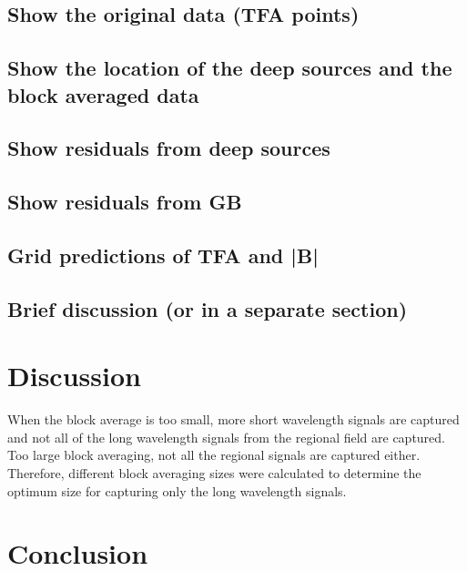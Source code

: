 \subsection{Show the original data (TFA points)}

\subsection{Show the location of the deep sources and the block averaged data}

\subsection{Show residuals from deep sources}

\subsection{Show residuals from GB}

\subsection{Grid predictions of TFA and |B|}

\subsection{Brief discussion (or in a separate section)}


\section{Discussion}

When the block average is too small, more short wavelength signals are captured and not all of the long wavelength signals from the regional field are captured. Too large block averaging, not all the regional signals are captured either. Therefore, different block averaging sizes were calculated to determine the optimum size for capturing only the long wavelength signals.


\section{Conclusion}

\lipsum[1]


